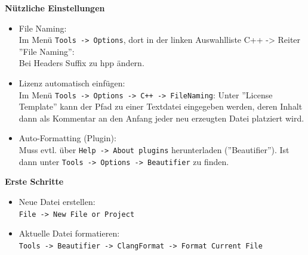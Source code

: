 \textbf{Nützliche Einstellungen}\\
\begin{itemize}
	\item File Naming:\\
  Im Menü \texttt{Tools -> Options}, dort in der linken Auswahlliste C++ ->
  Reiter ''File Naming'':\\ Bei Headers Suffix zu hpp ändern.

	\item Lizenz automatisch einfügen:\\

  Im Menü \texttt{Tools -> Options -> C++ -> FileNaming}: Unter ''License
  Template'' kann der Pfad zu einer Textdatei eingegeben werden, deren Inhalt
  dann als Kommentar an den Anfang jeder neu erzeugten Datei platziert wird.

	\item Auto-Formatting (Plugin):\\

  Muss evtl. über \texttt{Help -> About plugins} herunterladen (''Beautifier'').
  Ist dann unter \texttt{Tools -> Options -> Beautifier} zu finden.
  \end{itemize}
\textbf{Erste Schritte}\\
\begin{itemize}
	\item Neue Datei erstellen:\\
	\texttt{File -> New File or Project}
	\item Aktuelle Datei formatieren:\\
	\texttt{Tools -> Beautifier -> ClangFormat -> Format Current File}
\end{itemize}
